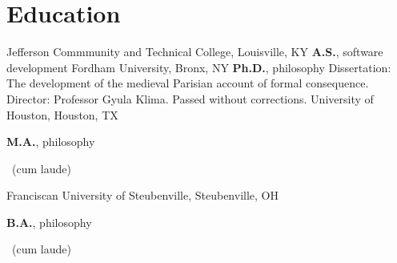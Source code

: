 \vspace*{0.4cm}
\section{Education}
{%
	Jefferson Commmunity and Technical College, Louisville, KY}
{%
	\textbf{A.S.}, software development}
{}
	{%
		Fordham University, Bronx, NY}
	{%
		\textbf{Ph.D.}, philosophy}
	{%
	Dissertation: The development of the medieval Parisian account of formal consequence. Director: Professor Gyula Klima. Passed without corrections.}
		{
			University of Houston, Houston, TX}
		{
			\textbf{M.A.}, philosophy\begin{footnotesize}
				~(cum laude)
			\end{footnotesize}}
		{}
{
	Franciscan University of Steubenville, Steubenville, OH}
{
	\textbf{B.A.}, philosophy\begin{footnotesize}
		~(cum laude)
\end{footnotesize}}
{}
